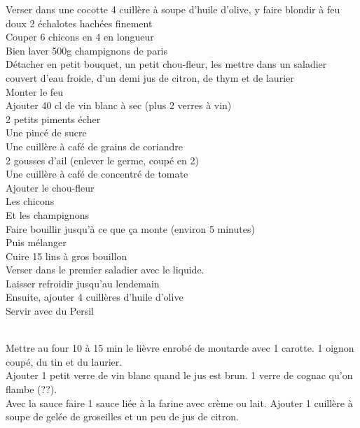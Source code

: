 \begin{minipage}[c]{\textwidth}
Verser dans une cocotte 4 cuillère à soupe d'huile d'olive, y faire blondir à feu doux 2 échalotes hachées finement\\
Couper 6 chicons en 4 en longueur\\
Bien laver 500g champignons de paris\\
Détacher en petit bouquet, un petit chou-fleur, les mettre dans un saladier couvert d'eau froide, d'un demi jus de citron, de thym et de laurier\\
Monter le feu\\
Ajouter 40 cl de vin blanc à sec (plus 2 verres à vin)\\
2 petits piments écher\\
Une pincé de sucre\\
Une cuillère à café de grains de coriandre\\
2 gousses d'ail (enlever le germe, coupé en 2)\\
Une cuillère à café de concentré de tomate\\
Ajouter le chou-fleur\\
Les chicons\\
Et les champignons\\
Faire bouillir jusqu'à ce que ça monte (environ 5 minutes)\\
Puis mélanger\\
Cuire 15 lins à gros bouillon\\
Verser dans le premier saladier avec le liquide.\\
Laisser refroidir jusqu'au lendemain\\
Ensuite, ajouter 4 cuillères d'huile d'olive\\
Servir avec du Persil\\
\\

\end{minipage}

\begin{minipage}[c]{\textwidth}
Mettre au four 10 à 15 min le lièvre enrobé de moutarde avec 1 carotte. 1 oignon coupé, du tin et du laurier. \\
Ajouter 1 petit verre de vin blanc quand le jus est brun. 1 verre de cognac qu'on flambe (??). \\
Avec la sauce faire 1 sauce liée à la farine avec crème ou lait.  Ajouter  1 cuillère à soupe de gelée de groseilles et un peu de jus de citron.\\
\\

\end{minipage}

